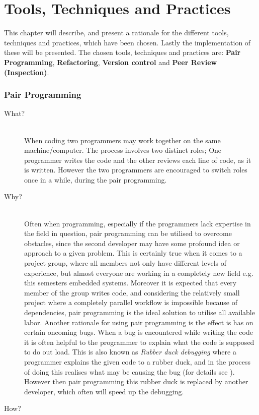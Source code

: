 
\chapter{Tools, Techniques and Practices} %
\label{cha:tools_techniques_and_practices}
This chapter will describe, and present a rationale for the different tools, techniques and practices, which have been chosen.
Lastly the implementation of these will be presented.
The chosen tools, techniques and practices are: \textbf{Pair Programming}, \textbf{Refactoring}, \textbf{Version control} and \textbf{Peer Review (Inspection)}.

\subsection*{Pair Programming} %
\label{sub:pair_programming}
\begin{description}
    \item[What?]\hfill\\
    When coding two programmers may work together on the same machine/computer.
The process involves two distinct roles; One programmer writes the code and the other reviews each line of code, as it is written. 
However the two programmers are encouraged to switch roles once in a while, during the pair programming.
    
    \item[Why?]\hfill\\ 
    Often when programming, especially if the programmers lack expertise in the field in question, pair programming can be utilised to overcome obstacles, since the second developer may have some profound idea or approach to a given problem.
    This is certainly true when it comes to a project group, where all members not only have different levels of experience, but almost everyone are working in a completely new field e.g. this semesters embedded systems.
    Moreover it is expected that every member of the group writes code, and considering the relatively small project where a completely parallel workflow is impossible because of dependencies, pair programming is the ideal solution to utilise all available labor.
    Another rationale for using pair programming is the effect is has on certain oncoming bugs.
    When a bug is encountered while writing the code it is often helpful to the programmer to explain what the code is supposed to do out load.
    This is also known as \emph{Rubber duck debugging} where a programmer explains the given code to a rubber duck, and in the process of doing this realises what may be causing the bug (for details see \cite{wiki:Rubber_duck debugging}).
    However then pair programming this rubber duck is replaced by another developer, which often will speed up the debugging.
    
    \item[How?]\hfill\\
    
\end{description}
